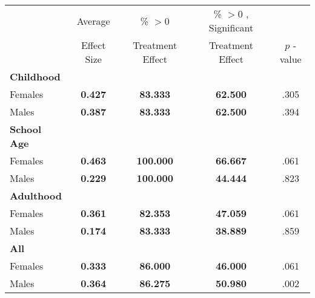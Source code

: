 \begin{tabular}{l c c c c}
\toprule
 & Average & \% $ >0 $ & \% $ >0 $ , Significant & \citet{Rosenbaum_2005_Distribution_JRSS} \\
 & Effect Size & Treatment Effect & Treatment Effect & $ p $ -value \\
\midrule
\textbf{Childhood} & & & & \\
\quad Females &  \textbf{    0.427} & \textbf{   83.333} & \textbf{   62.500} & .305 \\
\quad Males &  \textbf{    0.387} & \textbf{   83.333} & \textbf{   62.500} & .394 \\
\midrule
\textbf{School Age} & & & & \\
\quad Females &  \textbf{    0.463} & \textbf{  100.000} & \textbf{   66.667} & .061 \\
\quad Males &  \textbf{    0.229} & \textbf{  100.000} & \textbf{   44.444} & .823 \\
\midrule
\textbf{Adulthood} & & & & \\
\quad Females &  \textbf{    0.361} & \textbf{   82.353} & \textbf{   47.059} & .061 \\
\quad Males &  \textbf{    0.174} & \textbf{   83.333} & \textbf{   38.889} & .859 \\
\midrule
\textbf{All} & & & & \\
\quad Females &  \textbf{    0.333} & \textbf{   86.000} & \textbf{   46.000} & .061 \\
\quad Males &  \textbf{    0.364} & \textbf{   86.275} & \textbf{   50.980} & .002 \\
\midrule
\bottomrule
\end{tabular}
